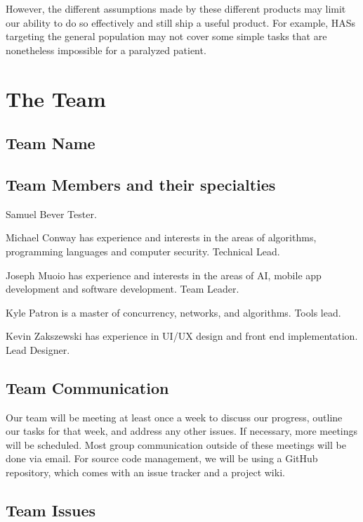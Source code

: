 \documentclass{report}
\begin{document}
However, the different assumptions made by these different products may limit
our ability to do so effectively and still ship a useful product. For example,
HASs targeting the general population may not cover some simple tasks that are
nonetheless impossible for a paralyzed patient.

\newpage
\section*{\centering The Team}

\subsection*{Team Name}


\subsection*{Team Members and their specialties}

Samuel Bever Tester.

Michael Conway has experience and interests in the areas of algorithms,
programming languages and computer security. Technical Lead. %

Joseph Muoio has experience and interests in the areas of AI, mobile app
development and software development. Team Leader.

Kyle Patron is a master of concurrency, networks, and algorithms. Tools lead.

Kevin Zakszewski has experience in UI/UX design and front end implementation. Lead Designer.



\subsection*{Team Communication}

Our team will be meeting at least once a week to discuss our progress, outline
our tasks for that week, and address any other issues. If necessary, more
meetings will be scheduled. Most group communication outside of these meetings
will be done via email. For source code management, we will be using a GitHub
repository, which comes with an issue tracker and a project wiki.

\subsection*{Team Issues}
\end{document}
